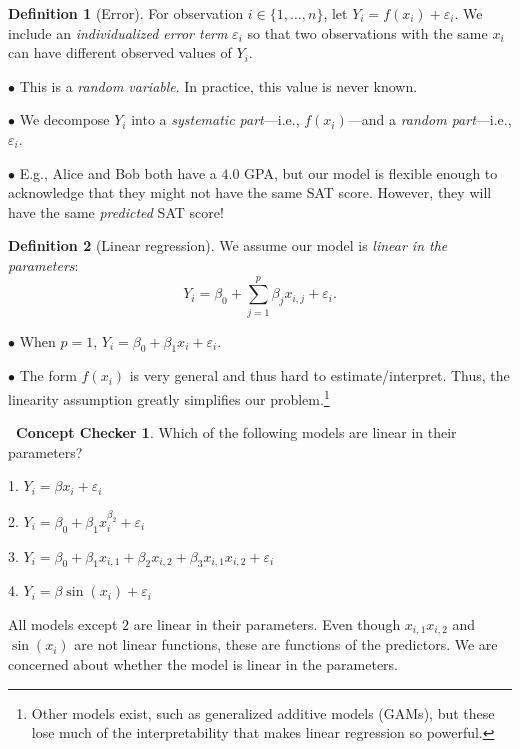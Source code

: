 \documentclass[12pt,oneside]{article}
\theoremstyle{definition}
\newtheorem{definition}{Definition}
\newtheorem{concept}{\faPen \ Concept Checker}
\theoremstyle{remark}
\begin{document}
\begin{definition}[Error]
For observation $i \in \{1, \ldots, n\}$, let $Y_i = f(x_i) + \varepsilon_i$. We include an \textit{individualized error term} $\varepsilon_i$ so that two observations with the same $x_i$ can have different observed values of $Y_i$.

$\bullet$ This is a \textit{random variable}. In practice, this value is never known.

$\bullet$ We decompose $Y_i$ into a \textit{systematic part}—i.e., $f(x_i)$—and a \textit{random part}—i.e., $\varepsilon_i$.

$\bullet$ E.g., Alice and Bob both have a $4.0$ GPA, but our model is flexible enough to acknowledge that they might not have the same SAT score. However, they will have the same \textit{predicted} SAT score!
\end{definition}

\begin{definition}[Linear regression]
We assume our model is \textit{linear in the parameters}: \[Y_i = \beta_0 + \sum_{j = 1}^{p} \beta_j x_{i, j} + \varepsilon_i.\]

$\bullet$ When $p = 1$, $Y_i = \beta_0 + \beta_1 x_i + \varepsilon_i$.

$\bullet$ The form $f(x_i)$ is very general and thus hard to estimate/interpret. Thus, the linearity assumption greatly simplifies our problem.\footnote{Other models exist, such as generalized additive models (GAMs), but these lose much of the interpretability that makes linear regression so powerful.}
\end{definition}

\begin{concept}
Which of the following models are linear in their parameters?

1. $Y_i = \beta x_i + \varepsilon_i$

2. $Y_i = \beta_0 + \beta_1 x_i^{\beta_2} + \varepsilon_i$

3. $Y_i = \beta_0 + \beta_1 x_{i, 1} + \beta_2 x_{i, 2} + \beta_3 x_{i, 1} x_{i, 2} + \varepsilon_i$

4. $Y_i = \beta \sin(x_i) + \varepsilon_i$
\end{concept}

\begin{solutionbox}
All models except $2$ are linear in their parameters. Even though $x_{i, 1} x_{i, 2}$ and $\sin(x_i)$ are not linear functions, these are functions of the predictors. We are concerned about whether the model is linear in the parameters.
\end{solutionbox}
\end{document}
